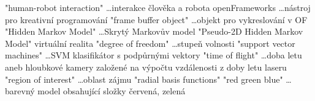 
\abbrv[HRI]	"human-robot interaction" \dots interakce člověka a robota
\abbrv[OF]	openFrameworks \dots nástroj pro kreativní programování
\abbrv[FBO]  "frame buffer object" \dots objekt pro vykreslování v OF
\abbrv[HMM]  "Hidden Markov Model" \dots Skrytý Markovův model
\abbrv[P2DHMM]  "Pseudo-2D Hidden Markov Model"
\abbrv[VR]  virtuální realita
\abbrv[DOF]  "degree of freedom" \dots stupeň volnosti
\abbrv[SVM]  "support vector machines" \dots SVM klasifikátor s podpůrnými vektory
\abbrv[TOF]  "time of flight" \dots doba letu aneb hloubkové kamery založené na výpočtu vzdálenosti z doby letu laseru
\abbrv[ROI]  "region of interest" \dots oblast zájmu
\abbrv[RBF]  "radial basis functions"
\abbrv[RGB]  "red green blue" \dots barevný model obsahující složky červená, zelená 

\stopAbbreviations

\endinput
